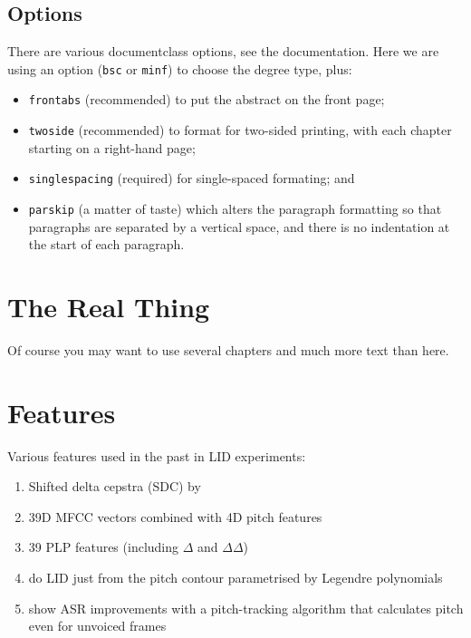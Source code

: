 \documentclass[bsc,frontabs,twoside,singlespacing,parskip,deptreport]{infthesis}
\begin{document}
{  \section{Options}{
    There are various documentclass options, see the documentation.  Here we are
    using an option ({\tt bsc} or {\tt minf}) to choose the degree type, plus:
    \begin{itemize}
    \item {\tt frontabs} (recommended) to put the abstract on the front page;
    \item {\tt twoside} (recommended) to format for two-sided printing, with
      each chapter starting on a right-hand page;
    \item {\tt singlespacing} (required) for single-spaced formating; and
    \item {\tt parskip} (a matter of taste) which alters the paragraph formatting so that
    paragraphs are separated by a vertical space, and there is no
    indentation at the start of each paragraph.
    \end{itemize}
  }
}
\chapter{The Real Thing}{
  Of course
  you may want to use several chapters and much more text than here.
}

\chapter{Features}{
  Various features used in the past in LID experiments:
  \begin{enumerate}
  \item{Shifted delta cepstra (SDC) by \cite{Ferrer_et_al_2016}}
  \item{39D MFCC vectors combined with 4D pitch features \citep{Song_et_al_2013}}
  \item{39 PLP features (including $\Delta$ and $\Delta\Delta$) \citep{Lopez-Moreno_et_al_2014}}
  \item{\cite{Lin_et_al_2005} do LID just from the pitch contour parametrised by Legendre polynomials}
  \item{\cite{Ghahremani_et_al_2014} show ASR improvements with a pitch-tracking algorithm that calculates pitch even for unvoiced frames}
  \end{enumerate}
}



\end{document}

